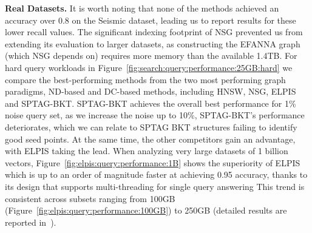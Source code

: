 \noindent\textbf{Real Datasets.} 
It is worth noting that none of the methods achieved an accuracy over 0.8 on the Seismic dataset, leading us to report results for these lower recall values. 
The significant indexing footprint of NSG prevented us from extending its evaluation to larger datasets, as constructing the EFANNA graph (which NSG depends on) requires more memory than the available 1.4TB.
For hard query workloads in Figure~\ref{fig:search:query:performance:25GB:hard} we compare the best-performing methods from the two most performing graph paradigms, ND-based and DC-based methods, including HNSW, NSG, ELPIS and SPTAG-BKT. 
SPTAG-BKT achieves the overall best performance for 1\% noise query set, as we increase the noise up to 10\%, SPTAG-BKT's performance deteriorates, which we can relate to SPTAG BKT structures failing to identify good seed points. At the same time, the other competitors gain an advantage, with ELPIS taking the lead. 
When analyzing very large datasets of 1 billion vectors, Figure~\ref{fig:elpis:query:performance:1B} shows the superiority of ELPIS which is up to an order of magnitude faster at achieving 0.95 accuracy, thanks to its design that supports multi-threading for single query answering
This trend is consistent across subsets ranging from 100GB (Figure~\ref{fig:elpis:query:performance:100GB}) to 250GB (detailed results are reported in~\cite{url/GASS}).


